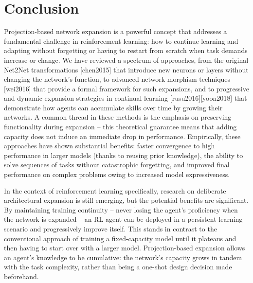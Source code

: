 \section{Conclusion}
Projection-based network expansion is a powerful concept that addresses a fundamental challenge in reinforcement learning: how to continue learning and adapting without forgetting or having to restart from scratch when task demands increase or change. We have reviewed a spectrum of approaches, from the original Net2Net transformations [chen2015] that introduce new neurons or layers without changing the network’s function, to advanced network morphism techniques [wei2016] that provide a formal framework for such expansions, and to progressive and dynamic expansion strategies in continual learning [rusu2016][yoon2018] that demonstrate how agents can accumulate skills over time by growing their networks. A common thread in these methods is the emphasis on preserving functionality during expansion – this theoretical guarantee means that adding capacity does not induce an immediate drop in performance. Empirically, these approaches have shown substantial benefits: faster convergence to high performance in larger models (thanks to reusing prior knowledge), the ability to solve sequences of tasks without catastrophic forgetting, and improved final performance on complex problems owing to increased model expressiveness.

In the context of reinforcement learning specifically, research on deliberate architectural expansion is still emerging, but the potential benefits are significant. By maintaining training continuity – never losing the agent’s proficiency when the network is expanded – an RL agent can be deployed in a persistent learning scenario and progressively improve itself. This stands in contrast to the conventional approach of training a fixed-capacity model until it plateaus and then having to start over with a larger model. Projection-based expansion allows an agent’s knowledge to be cumulative: the network’s capacity grows in tandem with the task complexity, rather than being a one-shot design decision made beforehand.

